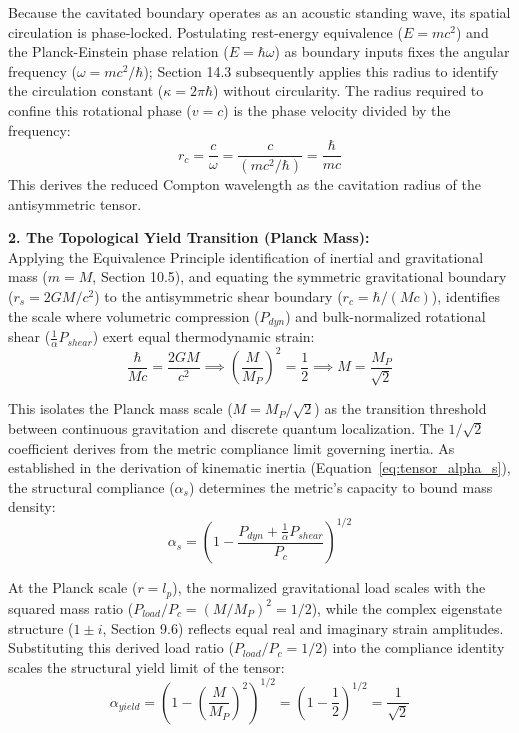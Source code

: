 Because the cavitated boundary operates as an acoustic standing wave, its spatial circulation is phase-locked. Postulating rest-energy equivalence ($E = mc^2$) and the Planck-Einstein phase relation ($E = \hbar \omega$) as boundary inputs fixes the angular frequency ($\omega = mc^2/\hbar$); Section 14.3 subsequently applies this radius to identify the circulation constant ($\kappa = 2\pi\hbar$) without circularity. The radius required to confine this rotational phase ($v = c$) is the phase velocity divided by the frequency:
\begin{equation}
    r_c = \frac{c}{\omega} = \frac{c}{(mc^2/\hbar)} = \frac{\hbar}{mc}
\end{equation}
This derives the reduced Compton wavelength as the cavitation radius of the antisymmetric tensor. 

\textbf{2. The Topological Yield Transition (Planck Mass):} \\ 
Applying the Equivalence Principle identification of inertial and gravitational mass ($m = M$, Section 10.5), and equating the symmetric gravitational boundary ($r_s = 2GM/c^2$) to the antisymmetric shear boundary ($r_c = \hbar/(Mc)$), identifies the scale where volumetric compression ($P_{dyn}$) and bulk-normalized rotational shear ($\frac{1}{\alpha}P_{shear}$) exert equal thermodynamic strain: %
\begin{equation}
    \frac{\hbar}{Mc} = \frac{2GM}{c^2} \implies \left(\frac{M}{M_P}\right)^2 = \frac{1}{2} \implies M = \frac{M_P}{\sqrt{2}} %
\end{equation}

This isolates the Planck mass scale ($M = M_P / \sqrt{2}$) as the transition threshold between continuous gravitation and discrete quantum localization. The $1/\sqrt{2}$ coefficient derives from the metric compliance limit governing inertia. As established in the derivation of kinematic inertia (Equation~\ref{eq:tensor_alpha_s}), the structural compliance ($\alpha_s$) determines the metric's capacity to bound mass density: %
\begin{equation}
    \alpha_s = \left( 1 - \frac{P_{dyn} + \frac{1}{\alpha}P_{shear}}{P_c} \right)^{1/2} %
\end{equation}

At the Planck scale ($r = l_p$), the normalized gravitational load scales with the squared mass ratio ($P_{load}/P_c = (M/M_P)^2 = 1/2$), while the complex eigenstate structure ($1 \pm i$, Section 9.6) reflects equal real and imaginary strain amplitudes. %
Substituting this derived load ratio ($P_{load}/P_c = 1/2$) into the compliance identity scales the structural yield limit of the tensor: %
\begin{equation}
    \alpha_{yield} = \left( 1 - \left(\frac{M}{M_P}\right)^2 \right)^{1/2} = \left( 1 - \frac{1}{2} \right)^{1/2} = \frac{1}{\sqrt{2}} %
\end{equation}


